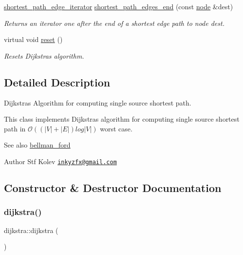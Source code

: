 \begin{DoxyCompactItemize}
\mbox{\hyperlink{classdijkstra_ad35d95d4ed7a4202a5d048a63aa115b9}{shortest\+\_\+path\+\_\+edge\+\_\+iterator}} \mbox{\hyperlink{classdijkstra_a031e6fef10aa40aad10edc1053ad9cf0}{shortest\+\_\+path\+\_\+edges\+\_\+end}} (const \mbox{\hyperlink{classnode}{node}} \&dest)
\begin{DoxyCompactList}\small\item\em Returns an iterator one after the end of a shortest edge path to node {\ttfamily dest}. \end{DoxyCompactList}\item 
virtual void \mbox{\hyperlink{classdijkstra_a444c288b3a49ec1c2973459dad55ffb3}{reset}} ()
\begin{DoxyCompactList}\small\item\em Resets Dijkstra\textquotesingle{}s algorithm. \end{DoxyCompactList}\end{DoxyCompactItemize}


\subsection{Detailed Description}
Dijkstra\textquotesingle{}s Algorithm for computing single source shortest path. 

This class implements Dijkstra\textquotesingle{}s algorithm for computing single source shortest path in $\mathcal{O}((|V| + |E|) log |V|)$ worst case.

\begin{DoxySeeAlso}{See also}
\mbox{\hyperlink{classbellman__ford}{bellman\+\_\+ford}}
\end{DoxySeeAlso}
\begin{DoxyAuthor}{Author}
Stf Kolev \href{mailto:inkyzfx@gmail.com}{\tt inkyzfx@gmail.\+com} 
\end{DoxyAuthor}


\subsection{Constructor \& Destructor Documentation}
\mbox{\label{classdijkstra_a64a1fcb9cca32ff932b9b98a08cff106}} 
\subsubsection{\texorpdfstring{dijkstra()}{dijkstra()}}
{\footnotesize\ttfamily dijkstra\+::dijkstra (\begin{DoxyParamCaption}{ }\end{DoxyParamCaption})}



